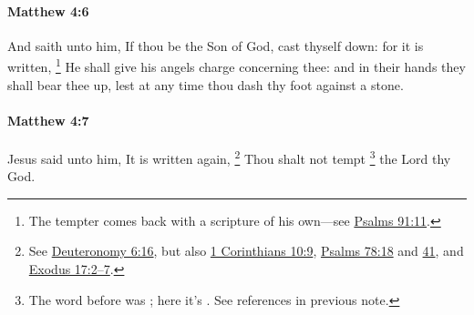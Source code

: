 		\paragraph{Matthew 4:6} %
			\label{MATTHEW-4-6}

			And saith unto him, If thou be the Son of God, cast thyself down: for it is written,%
				\footnote{%
					The tempter comes back with a scripture of his own---see \hyperref[PSALMS-91-11]{Psalms 91:11}. 
					}
			He shall give his angels charge concerning thee: and in their hands they shall bear thee up, lest at any time thou dash thy foot against a stone.

			\begin{framed}
			\scriptsize
				\begin{compactdesc}
					\item[SBLG] 
				\end{compactdesc}
			\end{framed}

		\paragraph{Matthew 4:7} %
			\label{MATTHEW-4-7}

			Jesus said unto him, It is written again,%
				\footnote{%
					See \hyperref[DEUTERONOMY-6-16]{Deuteronomy 6:16}, but also \hyperref[1CORINTHIANS-10-9]{1 Corinthians 10:9}, \hyperref[PSALMS-78-18]{Psalms 78:18} and \hyperref[PSALMS-78-41]{41}, and \hyperref[EXODUS-17-2]{Exodus 17:2--7}.
					}
			Thou shalt not tempt%
				\footnote{%
					The word before was ; here it's \hyperref[EKPEIRAZO]{}. See references in previous note.
					} 
			the Lord thy God.

